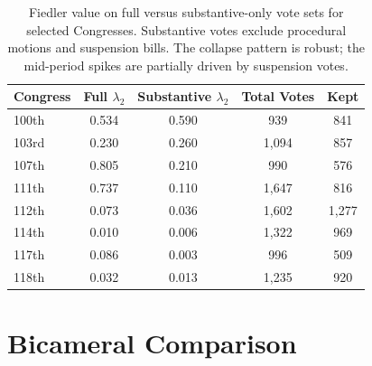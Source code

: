 \documentclass[12pt, a4paper]{article}
\begin{document}
\begin{table}[H]
\centering
{\small
\caption{Fiedler value on full versus substantive-only vote sets for selected Congresses. Substantive votes exclude procedural motions and suspension bills. The collapse pattern is robust; the mid-period spikes are partially driven by suspension votes.}
\label{tab:vote_filter}
\begin{tabular}{lcccc}
\toprule
Congress & Full $\lambda_2$ & Substantive $\lambda_2$ & Total Votes & Kept \\
\midrule
100th & 0.534 & 0.590 & 939 & 841 \\
103rd & 0.230 & 0.260 & 1,094 & 857 \\
107th & 0.805 & 0.210 & 990 & 576 \\
111th & 0.737 & 0.110 & 1,647 & 816 \\
112th & 0.073 & 0.036 & 1,602 & 1,277 \\
114th & 0.010 & 0.006 & 1,322 & 969 \\
117th & 0.086 & 0.003 & 996 & 509 \\
118th & 0.032 & 0.013 & 1,235 & 920 \\
\bottomrule
\end{tabular}
}
\end{table}

\section{Bicameral Comparison}
\label{app:bicameral}
\end{document}
